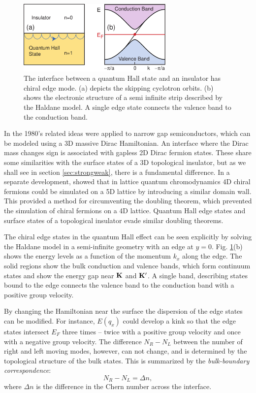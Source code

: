 \documentclass[twocolumn,floatfix,showpacs,rmp,aps]{revtex4}
\begin{document}
	\begin{figure}
		\includegraphics[width=3in]{Fig2}
		\caption{The interface between a quantum Hall state and an insulator has chiral edge mode.
			(a) depicts the skipping cyclotron orbits.  (b) shows the electronic structure of a semi infinite
			strip described by the Haldane model.  A single edge state connects the valence band to the
			conduction band.}
		\label{fig:qhalledge}
	\end{figure}
	
	In the 1980's related ideas were applied to narrow gap
	semiconductors,
	which can be modeled using a 3D massive Dirac Hamiltonian\cite{volkov85,fradkin86}.
	An interface where the Dirac mass changes sign is associated with gapless 2D
	Dirac fermion states.  These share some similarities with
	the surface states of a 3D topological insulator, but as we shall see in
	section \ref{sec:strongweak}, there is a fundamental difference.
	In a separate development, \textcite{kaplan92} showed that in lattice
	quantum chromodynamics 4D chiral fermions could be simulated on
	a 5D lattice by introducing a similar domain wall.  This provided a method for circumventing the
	doubling theorem\cite{nielssen83}, which prevented the simulation of
	chiral fermions on a 4D lattice.  Quantum Hall edge states and surface states
	of a topological insulator evade similar doubling theorems.
	
	The chiral edge states in the quantum Hall effect can be seen explicitly by solving
	the Haldane model in a semi-infinite geometry with an edge at $y=0$.  Fig.
	\ref{fig:qhalledge}(b) shows the energy levels as a function of the momentum
	$k_x$ along the edge.  The solid regions show the bulk conduction and
	valence bands, which form continuum states and show the energy gap
	near ${\bf K}$ and ${\bf K}'$.  A single band, describing states
	bound to the edge connects the
	valence band to the conduction band with a positive group velocity.
	
	By changing the Hamiltonian near the surface the dispersion
	of the edge states can be modified.  For instance, $E(q_x)$ could
	develop a kink so that the edge states intersect $E_F$
	three times -- twice with a positive group velocity and once with a
	negative group velocity.  The difference $N_R-N_L$ between the number of right
	and left moving modes, however,
	can not change, and is determined by the topological structure of
	the bulk states.  This is summarized by the {\it bulk-boundary
		correspondence}:
	\begin{equation}
		N_R-N_L = \Delta n,
		\label{bulkboundary}
	\end{equation}
	where $\Delta n$ is the difference in the Chern number across the interface.
	
\end{document}
